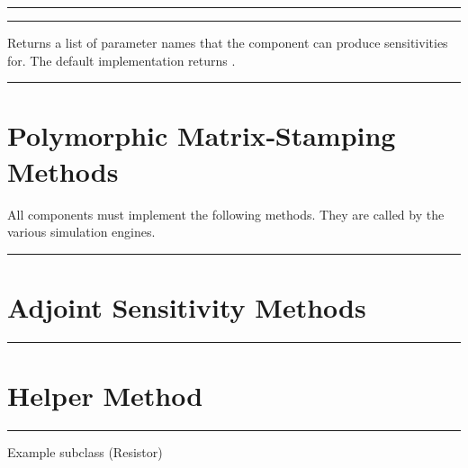 \documentclass[letterpaper,10pt,english]{sphinxmanual}
\begin{document}
\bigskip\hrule\bigskip



\bigskip\hrule\bigskip


\begin{fulllineitems}
\label{\detokenize{component_base:Component.differentiable_params}}
\pysigstartsignatures
\pysigline
{}
\pysigstopsignatures
\sphinxAtStartPar
Returns a list of parameter names that the component can produce sensitivities for.
The default implementation returns .

\end{fulllineitems}



\bigskip\hrule\bigskip



\section{Polymorphic Matrix‑Stamping Methods}
\label{\detokenize{component_base:polymorphic-matrixstamping-methods}}
\sphinxAtStartPar
All components must implement the following methods.  They are called by the various simulation engines.


\bigskip\hrule\bigskip



\section{Adjoint Sensitivity Methods}
\label{\detokenize{component_base:adjoint-sensitivity-methods}}

\bigskip\hrule\bigskip



\section{Helper Method}
\label{\detokenize{component_base:helper-method}}

\bigskip\hrule\bigskip


\sphinxAtStartPar
Example subclass (Resistor)
\end{document}

